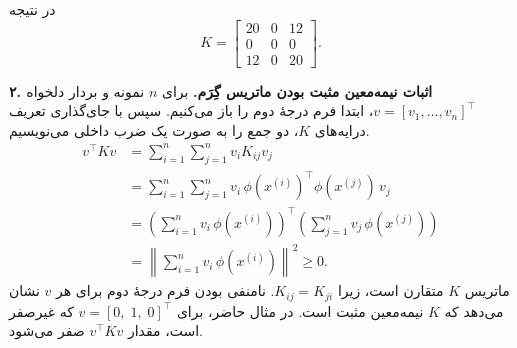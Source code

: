\documentclass{article}
\numberwithin{equation}{section}
\numberwithin{table}{section}
\begin{document}
در نتیجه
\[
    K=\begin{bmatrix}
        20&0&12\\
        0&0&0\\
        12&0&20
    \end{bmatrix}.
\]

\noindent\textbf{۲. اثبات نیمه‌معین مثبت بودن ماتریس گِرَم.}
برای \(n\) نمونه و بردار دلخواه \(v=[v_1,\ldots,v_n]^\top\)، ابتدا فرم درجهٔ دوم را باز می‌کنیم. سپس با جای‌گذاری تعریف درایه‌های \(K\)، دو جمع را به صورت یک ضرب داخلی می‌نویسیم.
\begin{align*}
    v^\top K v
    &=\sum_{i=1}^{n}\sum_{j=1}^{n} v_i K_{ij}v_j\\
    &=\sum_{i=1}^{n}\sum_{j=1}^{n}
      v_i\,\phi(x^{(i)})^\top\phi(x^{(j)})\,v_j\\
    &=\left(\sum_{i=1}^{n}v_i\,\phi(x^{(i)})\right)^\top
      \left(\sum_{j=1}^{n}v_j\,\phi(x^{(j)})\right)\\
    &=\left\lVert\sum_{i=1}^{n}v_i\,\phi(x^{(i)})\right\rVert^2
      \geq 0.
\end{align*}
ماتریس \(K\) متقارن است، زیرا \(K_{ij}=K_{ji}\). نامنفی بودن فرم درجهٔ دوم برای هر \(v\) نشان می‌دهد که \(K\) نیمه‌معین مثبت است. در مثال حاضر، برای \(v=[0,\;1,\;0]^\top\) که غیرصفر است، مقدار \(v^\top K v\) صفر می‌شود.
\end{document}
